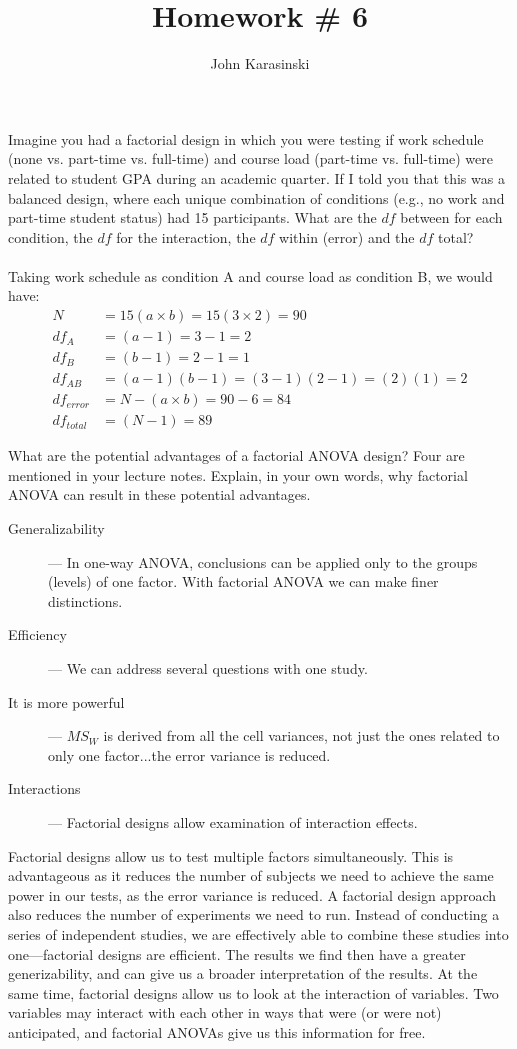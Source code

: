 \documentclass[onecolumn,10pt]{jhwhw}
\author{John Karasinski}
\title{Homework \# 6}
\begin{document}

\problem{}
Imagine you had a factorial design in which you were testing if work schedule (none vs. part-time vs. full-time) and course load (part-time vs. full-time) were related to student GPA during an academic quarter. If I told you that this was a balanced design, where each unique combination of conditions (e.g., no work and part-time student status) had 15 participants. What are the $df$ between for each condition, the $df$ for the interaction, the $df$ within (error) and the $df$ total?\\
\\
Taking work schedule as condition A and course load as condition B, we would have:
\begin{align*}
N &= 15 (a \times b) = 15 (3 \times 2) = 90\\
df_A &= (a - 1) = 3 - 1 = 2\\
df_B &= (b - 1) = 2 - 1 = 1\\
df_{AB} &= (a-1)(b-1) = (3-1)(2-1) = (2)(1) = 2\\
df_{error} &= N - (a \times b) = 90 - 6 = 84\\
df_{total} &= (N - 1) = 89
\end{align*}


\problem{}
What are the potential advantages of a factorial ANOVA design? Four are mentioned in your lecture notes. Explain, in your own words, why factorial ANOVA can result in these potential advantages.

\begin{description}
\item[Generalizability] --- In one-way ANOVA, conclusions can be applied only to the groups (levels) of one factor. With factorial ANOVA we can make finer distinctions.
\item[Efficiency] --- We can address several questions with one study.
\item[It is more powerful] --- $MS_W$ is derived from all the cell variances, not just the ones related to only one factor...the error variance is reduced.
\item[Interactions] --- Factorial designs allow examination of interaction effects.
\end{description}

Factorial designs allow us to test multiple factors simultaneously. This is advantageous as it reduces the number of subjects we need to achieve the same power in our tests, as the error variance is reduced. A factorial design approach also reduces the number of experiments we need to run. Instead of conducting a series of independent studies, we are effectively able to combine these studies into one---factorial designs are efficient. The results we find then have a greater generizability, and can give us a broader interpretation of the results. At the same time, factorial designs allow us to look at the interaction of variables. Two variables may interact with each other in ways that were (or were not) anticipated, and factorial ANOVAs give us this information for free.
\end{document}
